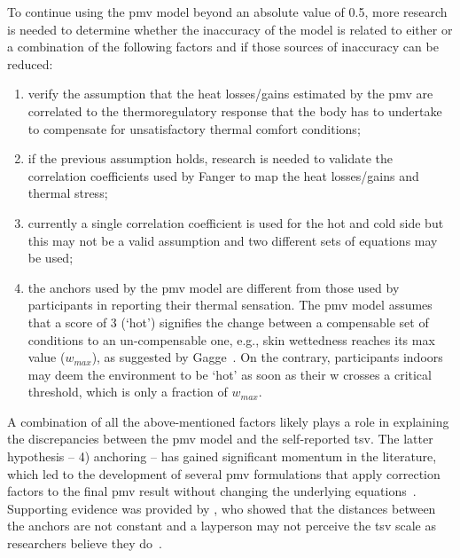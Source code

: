To continue using the \ac{pmv} model beyond an absolute value of \num{0.5}, more research is needed to determine whether the inaccuracy of the model is related to either or a combination of the following factors and if those sources of inaccuracy can be reduced:
\begin{enumerate}
    \item verify the assumption that the heat losses/gains estimated by the \ac{pmv} are correlated to the thermoregulatory response that the body has to undertake to compensate for unsatisfactory thermal comfort conditions;
    \item if the previous assumption holds, research is needed to validate the correlation coefficients used by Fanger to map the heat losses/gains and thermal stress;
    \item currently a single correlation coefficient is used for the hot and cold side but this may not be a valid assumption and two different sets of equations may be used;
    \item the anchors used by the \ac{pmv} model are different from those used by participants in reporting their thermal sensation.
    The \ac{pmv} model assumes that a score of 3 (`hot') signifies the change between a compensable set of conditions to an un-compensable one, e.g., skin wettedness reaches its max value ($w_{max}$), as suggested by Gagge~\cite{GaggeSET}.
    On the contrary, participants indoors may deem the environment to be `hot' as soon as their \ac{w} crosses a critical threshold, which is only a fraction of $w_{max}$.
\end{enumerate}

A combination of all the above-mentioned factors likely plays a role in explaining the discrepancies between the \ac{pmv} model and the self-reported \ac{tsv}.
The latter hypothesis -- 4) anchoring -- has gained significant momentum in the literature, which led to the development of several \ac{pmv} formulations that apply correction factors to the final \ac{pmv} result without changing the underlying equations~\cite{Yao2022, Toftum2002}.
Supporting evidence was provided by , who showed that the distances between the anchors are not constant and a layperson may not perceive the \ac{tsv} scale as researchers believe they do~\cite{schweiker2019scales, schweiker2020evaluating}.

